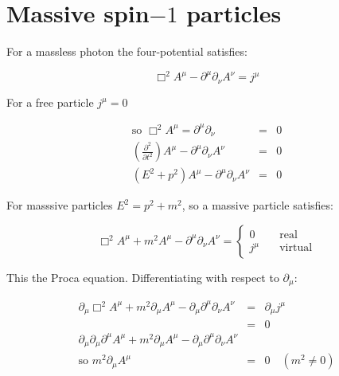 
\chapter{Massive spin\texorpdfstring{$-1$}{1} particles}

For a massless photon the four-potential satisfies:

\[
  \Box^2A^{\mu} - \partial^{\mu}\partial_{\nu}A^{\nu} = j^{\mu}
\]

For a free particle $j^{\mu} = 0$

\begin{eqnarray*}
  \textrm{so }\Box^2A^{\mu} = \partial^{\mu}\partial_{\nu} & = & 0 \\
  \left( \frac{\partial^2}{\partial t^2}\right)A^{\mu} - \partial^{\mu}\partial_{\nu}A^{\nu} & = & 0 \\
  \left(E^2 + p^2\right)A^{\mu} - \partial^{\mu}\partial_{\nu}A^{\nu} & = & 0
\end{eqnarray*}

For masssive particles $E^2 = p^2 + m^2$, so a massive particle satisfies:

\[
  \Box^2A^{\mu} + m^2A^{\mu}-\partial^{\mu}\partial_{\nu} A^{\nu} = 
  \left\{
    \begin{array}{cc}
    0 & \quad\textrm{real} \\
    j^{\mu} & \quad\textrm{virtual}
    \end{array}
  \right.
\]

This the Proca equation.  Differentiating with respect to $\partial_{\mu}$:

\begin{eqnarray*}
  \partial_{\mu}\Box^2A^{\mu} + m^2\partial_{\mu}A^{\mu} - \partial_{\mu}\partial^{\mu}\partial_{\nu}A^{\nu} & = & \partial_{\mu}j^{\mu} \\
  & = & 0 \\
  \partial_{\mu}\partial_{\mu}\partial^{\mu}A^{\mu} + m^2 \partial_{\mu}A^{\mu} - \partial_{\mu}\partial^{\mu}\partial_{\nu}A^{\nu} \\
  \textrm{so } m^2\partial_{\mu}A^{\mu} & = & 0 \quad (m^2 \neq 0)
\end{eqnarray*}

